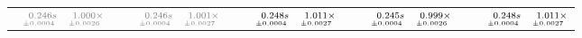 \documentclass[a4paper,UKenglish]{lipics-v2016}
\begin{document}
\begin{table*}
\begin{adjustbox}{width=1.2\textwidth,center}
\begin{tabular}{rrrp{.1em}rrrp{.1em}rrrp{.1em}rrrp{.1em}rrr}
\cellcolor{black!5}{\tiny \color{gray}{p$_{10}$}:}&\cellcolor{black!5}$\substack{\mathmakebox[.7cm][r]{\color{gray}{0.246}}\color{gray}{s}\\{\mathmakebox[.7cm][r]{\scriptscriptstyle \color{gray}{\pm 0.0004}}}}$&\cellcolor{black!5}$\substack{\mathmakebox[.7cm][r]{\color{gray}{1.000}}\color{gray}{\times}\\{\mathmakebox[.7cm][r]{\scriptscriptstyle \color{gray}{\pm 0.0026}}}}$&&\cellcolor{black!5}{\tiny \color{gray}{p$_{26}$}:}&\cellcolor{black!5}$\substack{\mathmakebox[.7cm][r]{\color{gray}{0.246}}\color{gray}{s}\\{\mathmakebox[.7cm][r]{\scriptscriptstyle \color{gray}{\pm 0.0004}}}}$&\cellcolor{black!5}$\substack{\mathmakebox[.7cm][r]{\color{gray}{1.001}}\color{gray}{\times}\\{\mathmakebox[.7cm][r]{\scriptscriptstyle \color{gray}{\pm 0.0027}}}}$&&\cellcolor{black!5}{\tiny p$_{42}$:}&\cellcolor{black!5}$\substack{\mathmakebox[.7cm][r]{0.248}s\\{\mathmakebox[.7cm][r]{\scriptscriptstyle \pm 0.0004}}}$&\cellcolor{black!5}$\substack{\mathmakebox[.7cm][r]{1.011}\times\\{\mathmakebox[.7cm][r]{\scriptscriptstyle \pm 0.0027}}}$&&\cellcolor{black!5}{\tiny p$_{58}$:}&\cellcolor{black!5}$\substack{\mathmakebox[.7cm][r]{0.245}s\\{\mathmakebox[.7cm][r]{\scriptscriptstyle \pm 0.0004}}}$&\cellcolor{black!5}$\substack{\mathmakebox[.7cm][r]{0.999}\times\\{\mathmakebox[.7cm][r]{\scriptscriptstyle \pm 0.0026}}}$&&\cellcolor{black!5}{\tiny p$_{74}$:}&\cellcolor{black!5}$\substack{\mathmakebox[.7cm][r]{0.248}s\\{\mathmakebox[.7cm][r]{\scriptscriptstyle \pm 0.0004}}}$&\cellcolor{black!5}$\substack{\mathmakebox[.7cm][r]{1.011}\times\\{\mathmakebox[.7cm][r]{\scriptscriptstyle \pm 0.0027}}}$\\

\end{tabular}
\end{adjustbox}
\end{table*}
\end{document}
